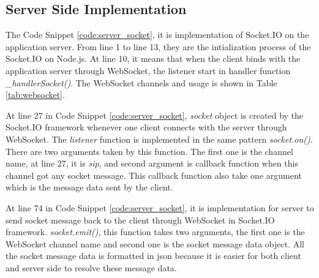 \subsection{Server Side Implementation}

\par The Code Snippet \ref{code:server_socket}, it is implementation of Socket.IO on the application server. From line 1 to line 13, they are the intialization process of the Socket.IO on Node.js. At line 10, it means that when the client binds with the application server through WebSocket, the listener start in handler function \textit{\_handlerSocket()}. The WebSocket channels and usage is shown in Table \ref{tab:websocket}.

\par At line 27 in Code Snippet \ref{code:server_socket}, \textit{socket} object is created by the Socket.IO framework whenever one client connects with the server through WebSocket. The \textit{listener} function is implemented in the same pattern \textit{socket.on()}. There are two arguments taken by this function. The first one is the channel name, at line 27, it is \textit{sip}, and second argument is callback function when this channel got any socket message. This callback function also take one argument which is the message data sent by the client.

\par At line 74 in Code Snippet \ref{code:server_socket}, it is implementation for server to send socket message back to the client through WebSocket in Socket.IO framework. \textit{socket.emit()}, this function takes two arguments, the first one is the WebSocket channel name and second one is the socket message data object. All the socket message data is formatted in \gls{json} because it is easier for both client and server side to resolve these message data.

